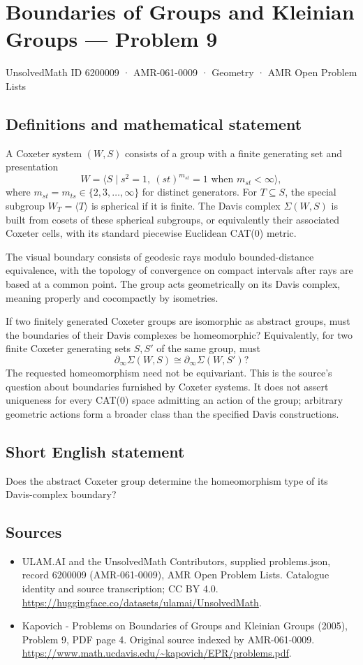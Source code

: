 \documentclass[11pt,a4paper]{article}
\begin{document}
\section*{Boundaries of Groups and Kleinian Groups — Problem 9}\label{6200009}
{\small UnsolvedMath ID 6200009 · AMR-061-0009 · Geometry · AMR Open Problem Lists}
\subsection{Definitions and mathematical statement}
A Coxeter system $(W,S)$ consists of a group with a finite generating set and presentation
\[
 W=\langle S\mid s^2=1,\ (st)^{m_{st}}=1
                 \text{ when }m_{st}<\infty\rangle,
\]
where $m_{st}=m_{ts}\in\{2,3,\ldots,\infty\}$ for distinct generators. For $T\subseteq S$, the special subgroup $W_T=\langle T\rangle$ is spherical if it is finite. The Davis complex $\Sigma(W,S)$ is built from cosets of these spherical subgroups, or equivalently their associated Coxeter cells, with its standard piecewise Euclidean CAT(0) metric.

The visual boundary consists of geodesic rays modulo bounded-distance equivalence, with the topology of convergence on compact intervals after rays are based at a common point. The group acts geometrically on its Davis complex, meaning properly and cocompactly by isometries.

If two finitely generated Coxeter groups are isomorphic as abstract groups, must the boundaries of their Davis complexes be homeomorphic? Equivalently, for two finite Coxeter generating sets $S,S'$ of the same group, must
\[
 \partial_\infty\Sigma(W,S)\cong\partial_\infty\Sigma(W,S')?
\]
The requested homeomorphism need not be equivariant. This is the source's question about boundaries furnished by Coxeter systems. It does not assert uniqueness for every CAT(0) space admitting an action of the group; arbitrary geometric actions form a broader class than the specified Davis constructions.
\subsection{Short English statement}
Does the abstract Coxeter group determine the homeomorphism type of its Davis-complex boundary?
\subsection{Sources}
\begin{itemize}
\item[S1] ULAM.AI and the UnsolvedMath Contributors, supplied problems.json, record 6200009 (AMR-061-0009), AMR Open Problem Lists. Catalogue identity and source transcription; CC BY 4.0.
\url{https://huggingface.co/datasets/ulamai/UnsolvedMath}.
\item[S2] Kapovich - Problems on Boundaries of Groups and Kleinian Groups (2005), Problem 9, PDF page 4. Original source indexed by AMR-061-0009.
\url{https://www.math.ucdavis.edu/~kapovich/EPR/problems.pdf}.
\end{itemize}
\end{document}
